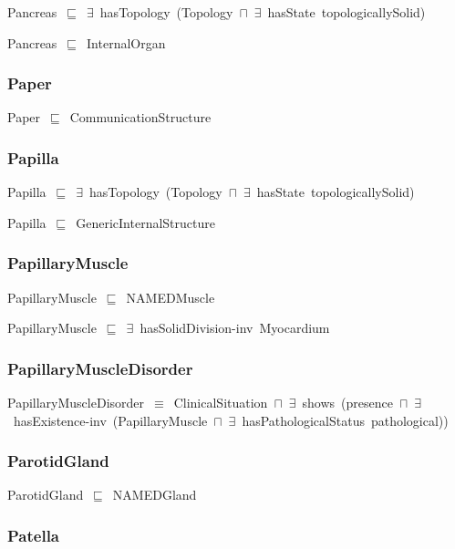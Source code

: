 \documentclass{article}
\begin{document}
Pancreas~\ensuremath{\sqsubseteq}~\ensuremath{\exists}~hasTopology~(Topology~\ensuremath{\sqcap}~\ensuremath{\exists}~hasState~topologicallySolid)~

Pancreas~\ensuremath{\sqsubseteq}~InternalOrgan~

\subsubsection*{Paper}

Paper~\ensuremath{\sqsubseteq}~CommunicationStructure~

\subsubsection*{Papilla}

Papilla~\ensuremath{\sqsubseteq}~\ensuremath{\exists}~hasTopology~(Topology~\ensuremath{\sqcap}~\ensuremath{\exists}~hasState~topologicallySolid)~

Papilla~\ensuremath{\sqsubseteq}~GenericInternalStructure~

\subsubsection*{PapillaryMuscle}

PapillaryMuscle~\ensuremath{\sqsubseteq}~NAMEDMuscle~

PapillaryMuscle~\ensuremath{\sqsubseteq}~\ensuremath{\exists}~hasSolidDivision-inv~Myocardium~

\subsubsection*{PapillaryMuscleDisorder}

PapillaryMuscleDisorder~\ensuremath{\equiv}~ClinicalSituation~\ensuremath{\sqcap}~\ensuremath{\exists}~shows~(presence~\ensuremath{\sqcap}~\ensuremath{\exists}~hasExistence-inv~(PapillaryMuscle~\ensuremath{\sqcap}~\ensuremath{\exists}~hasPathologicalStatus~pathological))

\subsubsection*{ParotidGland}

ParotidGland~\ensuremath{\sqsubseteq}~NAMEDGland~

\subsubsection*{Patella}
\end{document}
